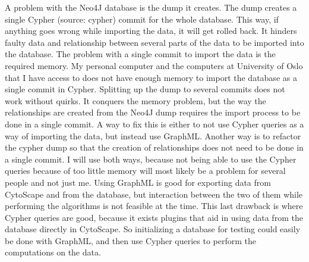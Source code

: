 \documentclass[UKenglish]{ifimaster}
\begin{document}
A problem with the Neo4J database is the dump it creates. The dump creates a
single Cypher (source: cypher) commit for the whole database. This way, if
anything goes wrong while importing the data, it will get rolled back. It
hinders faulty data and relationship between several parts of the data to be
imported into the database. The problem with a single commit to import the data
is the required memory. My personal computer and the computers at University of
Oslo that I have access to does not have enough memory to import the database as
a single commit in Cypher. Splitting up the dump to several commits does not
work without quirks. It conquers the memory problem, but the way the
relationships are created from the Neo4J dump requires the import process to be
done in a single commit. A way to fix this is either to not use Cypher queries
as a way of importing the data, but instead use GraphML. Another way is to
refactor the cypher dump so that the creation of relationships does not need to
be done in a single commit. I will use both ways, because not being able to use
the Cypher queries because of too little memory will most likely be a problem
for several people and not just me. Using GraphML is good for exporting data
from CytoScape and from the database, but interaction between the two of them
while performing the algorithms is not feasible at the time. This last drawback
is where Cypher queries are good, because it exists plugins that aid in using
data from the database directly in CytoScape. So initializing a database for
testing could easily be done with GraphML, and then use Cypher queries to
perform the computations on the data.
\end{document}
